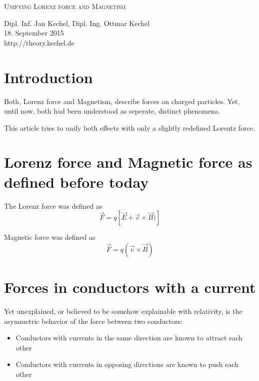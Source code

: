 \documentclass[12pt,a4paper,twocolumn]{article}
\begin{document}
%
%
\begin{titlepage}
\begin{center}
\vspace{1.5cm}

\Large \textsc{Unifying Lorenz force and Magnetism}

\vspace{6mm}

	\normalsize 
  Dipl. Inf. Jan Kechel, Dipl. Ing. Ottmar Kechel\\
	\vspace{6mm}
	18. September 2015\\
	\vspace{6mm}
    http://theory.kechel.de
\end{center}

\vspace{1.5cm}
\tableofcontents
\end{titlepage}

\section{Introduction}
Both, Lorenz force and Magnetism, describe forces on charged particles. Yet, until now, both had been understood as seperate, distinct phenomena.

This article tries to unify both effects with only a slightly redefined Lorentz force.

\section{Lorenz force and Magnetic force as defined before today}
The Lorenz force was defined as $$\vec{F}=q[\vec{E}+\vec{v} \times \vec{B})]$$

Magnetic force was defined as $$\vec{F}=q(\vec{v} \times \vec{B})$$

\section{Forces in conductors with a current}

Yet unexplained, or believed to be somehow explainable with relativity, is the asymmetric behavior of the force between two conductors:
\begin{itemize}
  \item Conductors with currents in the same direction are known to attract each other
  \item Conductors with currents in opposing directions are known to push each other
\end{itemize}
\end{document}
